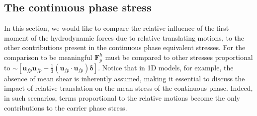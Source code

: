 

\subsection{The continuous phase stress}

In this section, we would like to compare the relative influence of the first moment of the hydrodynamic forces due to relative translating motions, to the other contributions present in the continuous phase equivalent stresses. 
For the comparison to be meaningful $\textbf{F}^h_p$ must be compared to other stresses proportional to $\sim [\textbf{u}_{fp}\textbf{u}_{fp}-\frac{1}{3}(\textbf{u}_{fp}\cdot\textbf{u}_{fp})\bm\delta]$. 
Notice that in 1D models, for example, the absence of mean shear is inherently assumed, making it essential to discuss the impact of relative translation on the mean stress of the continuous phase. 
Indeed, in such scenarios, terms proportional to the relative motions become the only contributions to the carrier phase stress. 

